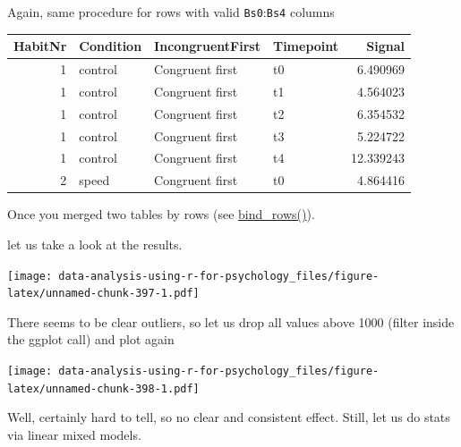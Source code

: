 \documentclass[
]{book}
\begin{document}
Again, same procedure for rows with valid \texttt{Bs0}:\texttt{Bs4} columns

\begin{tabular}{r|l|l|l|r}
\hline
HabitNr & Condition & IncongruentFirst & Timepoint & Signal\\
\hline
1 & control & Congruent first & t0 & 6.490969\\
\hline
1 & control & Congruent first & t1 & 4.564023\\
\hline
1 & control & Congruent first & t2 & 6.354532\\
\hline
1 & control & Congruent first & t3 & 5.224722\\
\hline
1 & control & Congruent first & t4 & 12.339243\\
\hline
2 & speed & Congruent first & t0 & 4.864416\\
\hline
\end{tabular}

Once you merged two tables by rows (see \href{https://dplyr.tidyverse.org/reference/bind.html}{bind\_rows()}).

let us take a look at the results.

\texttt{[image: data-analysis-using-r-for-psychology\_files/figure-latex/unnamed-chunk-397-1.pdf]}

There seems to be clear outliers, so let us drop all values above 1000 (filter inside the ggplot call) and plot again

\texttt{[image: data-analysis-using-r-for-psychology\_files/figure-latex/unnamed-chunk-398-1.pdf]}

Well, certainly hard to tell, so no clear and consistent effect. Still, let us do stats via linear mixed models.
\end{document}
